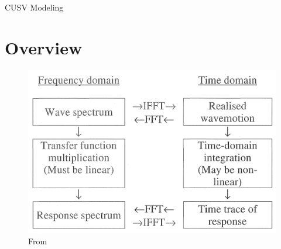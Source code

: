 \documentclass[11pt, letterpaper]{article}
\newcommand{\doctitle}{CUSV Modeling}
\newif\ifoverleaf %
\begin{document}
\overleaffalse

\newcommand{\SF}{0.2}
\newcommand{\SFb}{0.45}
\newcommand{\SFPic}{0.45}
\newcommand{\SFPlot}{0.45}
\newcommand{\SFc}{0.25}
\newcommand{\FigWidth}{\SFb}

\newpage
\begin{center}
{\huge \doctitle}
\end{center}

\section{Overview}

\begin{figure}[hbt!]
\centering
\includegraphics[width=0.6\linewidth]{images/bergdahl_roads.png}
\caption{From \cite{bergdahl09wave}}
\label{f:wave}
\end{figure}
\end{document}
